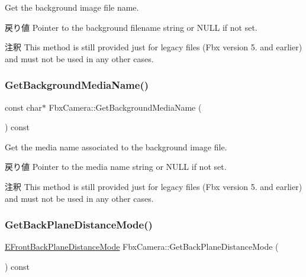 Get the background image file name. \begin{DoxyReturn}{戻り値}
Pointer to the background filename string or {\ttfamily N\+U\+LL} if not set. 
\end{DoxyReturn}
\begin{DoxyRemark}{注釈}
This method is still provided just for legacy files (Fbx version 5. and earlier) and must not be used in any other cases. 
\end{DoxyRemark}
\mbox{\label{class_fbx_camera_a00a5854e8b375a9888eae08ae4ce7552}} 
\subsubsection{\texorpdfstring{Get\+Background\+Media\+Name()}{GetBackgroundMediaName()}}
{\footnotesize\ttfamily const char$\ast$ Fbx\+Camera\+::\+Get\+Background\+Media\+Name (\begin{DoxyParamCaption}{ }\end{DoxyParamCaption}) const}

Get the media name associated to the background image file. \begin{DoxyReturn}{戻り値}
Pointer to the media name string or {\ttfamily N\+U\+LL} if not set. 
\end{DoxyReturn}
\begin{DoxyRemark}{注釈}
This method is still provided just for legacy files (Fbx version 5. and earlier) and must not be used in any other cases. 
\end{DoxyRemark}
\mbox{\label{class_fbx_camera_a862928086a5ae50086651ce6b96aa8c0}} 
\subsubsection{\texorpdfstring{Get\+Back\+Plane\+Distance\+Mode()}{GetBackPlaneDistanceMode()}}
{\footnotesize\ttfamily \hyperlink{class_fbx_camera_a79e74898d117e741c3fbd10b1ef21c79}{E\+Front\+Back\+Plane\+Distance\+Mode} Fbx\+Camera\+::\+Get\+Back\+Plane\+Distance\+Mode (\begin{DoxyParamCaption}{ }\end{DoxyParamCaption}) const}

